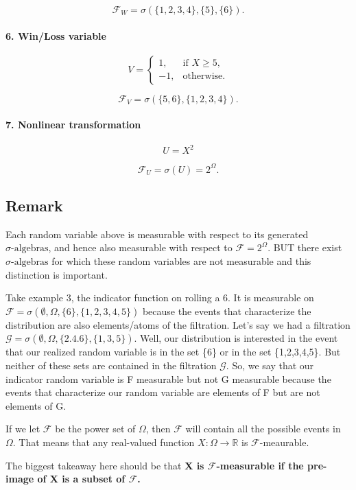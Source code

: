 \documentclass[11pt]{article}
\newcommand{\sigalg}{\sigma\text{-algebras}}
\newcommand{\filt}{\mathcal{F}}
\begin{document}
$$
\mathcal{F}_W
= \sigma(\{1,2,3,4\}, \{5\}, \{6\}).
$$

\paragraph{6. Win/Loss variable}
$$
V =
\begin{cases}
1, & \text{if } X \ge 5, \\
-1, & \text{otherwise}.
\end{cases}
$$

$$
\mathcal{F}_V
= \sigma(\{5,6\}, \{1,2,3,4\}).
$$

\paragraph{7. Nonlinear transformation}
$$
U = X^2
$$

$$
\mathcal{F}_U = \sigma(U) = 2^\Omega.
$$

\subsection*{Remark}
Each random variable above is measurable with respect to its generated
$\sigalg$, and hence also measurable with respect to $ \mathcal{F} = 2^\Omega $. BUT there exist $\sigalg$ for which these random variables are not measurable and this distinction is important. 

Take example 3, the indicator function on rolling a 6. 
It is measurable on $\filt = \sigma(\emptyset, \Omega, \{6\}, \{1,2,3,4,5\})$ because the events that characterize the distribution are also elements/atoms of the filtration.
Let's say we had a filtration $\mathcal{G} = \sigma(\emptyset, \Omega, \{2.4.6\},\{1,3,5\})$. Well, our distribution is interested in the event that our realized random variable is in the set \{6\} or in the set \{1,2,3,4,5\}. But neither of these sets are contained in the filtration $\mathcal{G}$. So, we say that our indicator random variable is F measurable but not G measurable because the events that characterize our random variable are elements of F but are not elements of G. 

If we let $\filt$ be the power set of $\Omega$, then $\filt$ will contain all the possible events in $\Omega$. That means that any real-valued function $X:\Omega \rightarrow \mathbb{R}$ is $\filt$-meaurable.

The biggest takeaway here should be that \textbf{X is $\filt$-measurable if the pre-image of X is a subset of $\filt$.}
\end{document}
